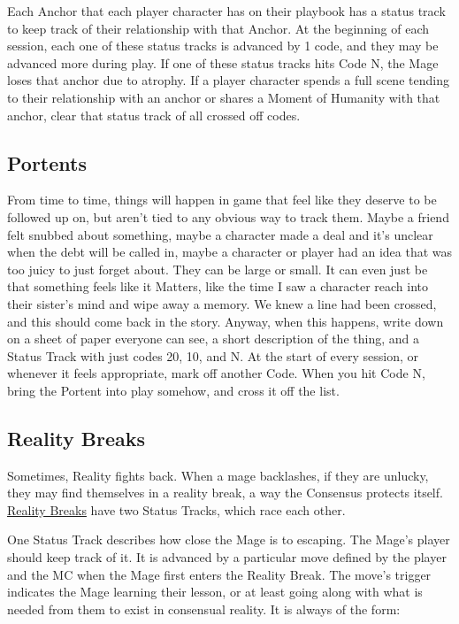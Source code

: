 \documentclass[
]{article}
\begin{document}
Each Anchor that each player character has on their playbook has a
status track to keep track of their relationship with that Anchor. At
the beginning of each session, each one of these status tracks is
advanced by 1 code, and they may be advanced more during play. If one of
these status tracks hits Code N, the Mage loses that anchor due to
atrophy. If a player character spends a full scene tending to their
relationship with an anchor or shares a Moment of Humanity with that
anchor, clear that status track of all crossed off codes.

\hypertarget{portents}{%
\subsection{Portents}\label{portents}}

From time to time, things will happen in game that feel like they
deserve to be followed up on, but aren't tied to any obvious way to
track them. Maybe a friend felt snubbed about something, maybe a
character made a deal and it's unclear when the debt will be called in,
maybe a character or player had an idea that was too juicy to just
forget about. They can be large or small. It can even just be that
something feels like it Matters, like the time I saw a character reach
into their sister's mind and wipe away a memory. We knew a line had been
crossed, and this should come back in the story. Anyway, when this
happens, write down on a sheet of paper everyone can see, a short
description of the thing, and a Status Track with just codes 20, 10, and
N. At the start of every session, or whenever it feels appropriate, mark
off another Code. When you hit Code N, bring the Portent into play
somehow, and cross it off the list.

\hypertarget{reality-breaks}{%
\subsection{Reality Breaks}\label{reality-breaks}}

Sometimes, Reality fights back. When a mage backlashes, if they are
unlucky, they may find themselves in a reality break, a way the
Consensus protects itself. \href{RealityBreaks}{Reality Breaks} have two
Status Tracks, which race each other.

One Status Track describes how close the Mage is to escaping. The Mage's
player should keep track of it. It is advanced by a particular move
defined by the player and the MC when the Mage first enters the Reality
Break. The move's trigger indicates the Mage learning their lesson, or
at least going along with what is needed from them to exist in
consensual reality. It is always of the form:
\end{document}
